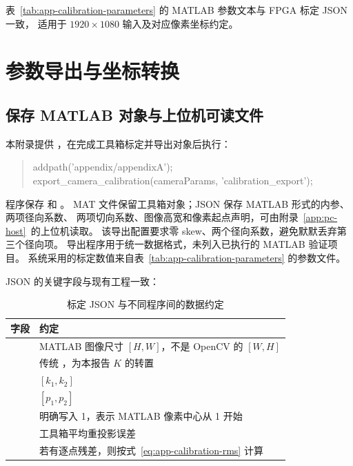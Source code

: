 表~\ref{tab:app-calibration-parameters} 的 MATLAB 参数文本与 FPGA 标定 JSON 一致，
适用于 $1920\times1080$ 输入及对应像素坐标约定。

\section{参数导出与坐标转换}
\subsection{保存 MATLAB 对象与上位机可读文件}
本附录提供 ，在完成工具箱标定并导出对象后执行：
\begin{quote}\small\ttfamily
addpath('appendix/appendixA');\\
export\_camera\_calibration(cameraParams, 'calibration\_export');
\end{quote}
程序保存  和 。
MAT 文件保留工具箱对象；JSON 保存 MATLAB 形式的内参、两项径向系数、
两项切向系数、图像高宽和像素起点声明，可由附录~\ref{app:pc-host}~的上位机读取。
该导出配置要求零 skew、两个径向系数，避免默默丢弃第三个径向项。
导出程序用于统一数据格式，未列入已执行的 MATLAB 验证项目。
系统采用的标定数值来自表~\ref{tab:app-calibration-parameters} 的参数文件。

JSON 的关键字段与现有工程一致：
\begin{table}[htbp]\centering\small
\caption{标定 JSON 与不同程序间的数据约定}\label{tab:app-calibration-json}
\begin{tabularx}{\textwidth}{>{\raggedright\arraybackslash}p{5.4cm}Y}
\toprule
字段 & 约定 \\
\midrule
{} & MATLAB 图像尺寸 $[H,W]$，不是 OpenCV 的 $[W,H]$ \\
 & 传统 ，为本报告 $K$ 的转置 \\
 & $[k_1,k_2]$ \\
 & $[p_1,p_2]$ \\
 & 明确写入 1，表示 MATLAB 像素中心从 1 开始 \\
 & 工具箱平均重投影误差 \\
 & 若有逐点残差，则按式~\eqref{eq:app-calibration-rms} 计算 \\
\bottomrule
\end{tabularx}
\end{table}

